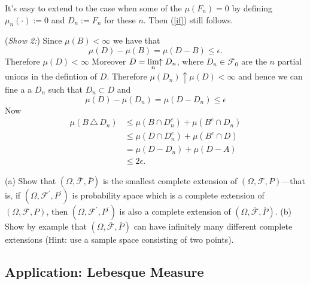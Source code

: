 \begin{exerciseproof}
It's easy to extend to the case when some of the $\mu(F_n)=0$ by defining $\mu_n (\cdot):=0$ and $D_n:=F_n$ for these $n$. Then (\ref{if}) still follows.

\textbullet({\sl Show 2:})
Since $\mu(B)<\infty$ we have that
\begin{equation}
 \mu(D)-\mu(B)=\mu(D-B)\leq \epsilon.
\end{equation}
Therefore $\mu(D)<\infty$
Moreover $D=\displaystyle\lim_{n}\!\!\uparrow D_n$, where $D_n\in \mathcal F_0$ are the $n$ partial unions in the defintion of $D$.
Therefore $\mu(D_n)\uparrow \mu(D)<\infty$ and hence we can fine a
 a $D_n$ such that $D_n\subset D$ and
\begin{equation}
\mu(D) - \mu(D_n)=\mu(D - D_n)\leq \epsilon
\end{equation}
Now
\begin{align*}
\mu(B\,\triangle\, D_n)
&\leq \mu(B\cap D_n^c) + \mu(B^c \cap D_n)\\
&\leq \mu(D \cap D_n^c) + \mu(B^c \cap D)\\
&= \mu(D - D_n) + \mu(D - A)\\
&\leq 2\epsilon.
\end{align*}
\end{exerciseproof}








\begin{exercise}
(a) Show that $(\Omega, \bar{\mathcal F}, \bar P)$ is the smallest complete extension of $(\Omega, \mathcal F, P)$---that is, if $(\Omega, \mathcal F^\prime, P^\prime)$ is probability space which is a complete extension of $(\Omega, \mathcal F, P)$, then $(\Omega, \mathcal F^\prime, P^\prime)$ is also a complete extension of $(\Omega, \bar{\mathcal F}, \bar P)$. (b) Show by example that $(\Omega, \bar{\mathcal F}, \bar P)$ can have infinitely many different complete extensions (Hint: use a sample space consisting of two points).
\end{exercise}






\subsection{Application: Lebesque Measure}






